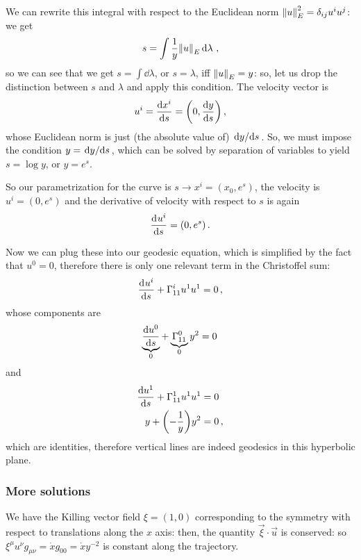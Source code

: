 \documentclass[main.tex]{subfiles}
\begin{document}
We can rewrite this integral with respect to the Euclidean norm \(\norm{u}_E^2 = \delta_{ij} u^{i} u^{j}\): we get 
%
\begin{align}
  s = \int \frac{1}{y} \norm{u}_E \dd{\lambda }
\,,
\end{align}
%
so we can see that we get \(s = \int \dd{\lambda }\), or \(s = \lambda \), iff \(\norm{u}_E = y\): so, let us drop the distinction between \(s\) and \(\lambda \) and apply this condition.
The velocity vector is 
%
\begin{align}
  u^{i} = \dv{x^{i}}{s} = \qty(0, \dv{y}{s})
\,,
\end{align}
%
whose Euclidean norm is just (the absolute value of) \(\dv*{y}{s}\). 
So, we must impose the condition \(y = \dv*{y}{s}\), which can be solved by separation of variables to yield \(s = \log y\), or \(y = e^{s}\). 

So our parametrization for the curve is \(s \rightarrow x^{i} = (x_0, e^{s})\), the velocity is \(u^{i} = (0, e^{s})\) and the derivative of velocity with respect to \(s\) is again 
%
\begin{align}
  \dv[]{u^{i}}{s} = (0, e^{s})
\,.
\end{align}

Now we can plug these into our geodesic equation, which is simplified by the fact that \(u^{0} = 0\), therefore there is only one relevant term in the Christoffel sum: 
%
\begin{align}
  \dv[]{ u^{i}}{s} + \Gamma^{i}_{11} u^{1} u^{1} = 0
\,,
\end{align}
%
whose components are 
%
\begin{align}
  \underbrace{\dv{ u^{0}}{s}}_{0} + \underbrace{\Gamma^{0}_{11}}_{0} y^2 = 0
\,
\end{align}
%
and 
%
\begin{subequations}
  \begin{align}
    \dv{ u^{1}}{s} + \Gamma^{1}_{11} u^{1} u^{1} &= 0  \\
    y + \qty(- \frac{1}{y}) y^2 &=0
    \,,
  \end{align}
\end{subequations}
%
which are identities, therefore vertical lines are indeed geodesics in this hyperbolic plane.

\subsubsection{More solutions}

We have the Killing vector field \(\xi = (1,0)\) corresponding to the symmetry with respect to translations along the \(x\) axis: then, the quantity \(\vec{\xi} \cdot \vec{u}\) is conserved: so \(\xi^{\mu } u^{\nu } g_{\mu \nu }=\dot{x} g_{00} = \dot{x} y^{-2}\) is constant along the trajectory.
\end{document}
